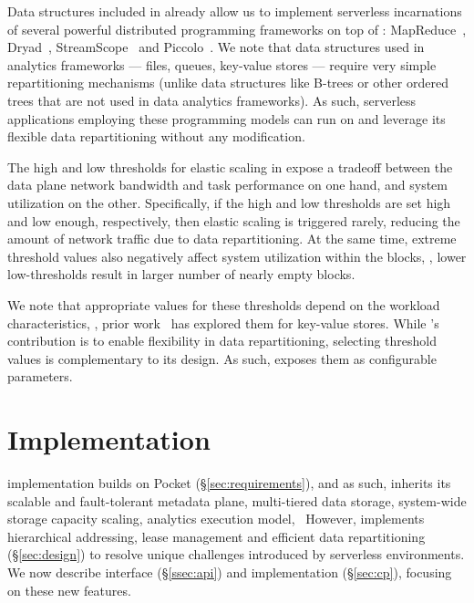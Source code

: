 Data structures included in \jiffy already allow us to implement serverless incarnations of several powerful distributed programming frameworks on top of \jiffy: MapReduce~\cite{mapreduce,spark}, Dryad~\cite{dryad}, StreamScope~\cite{streamscope} and Piccolo~\cite{piccolo}. We note that data structures used in analytics frameworks --- files, queues, key-value stores --- require very simple repartitioning mechanisms (unlike data structures like B-trees or other ordered trees that are not used in data analytics frameworks). As such, serverless applications employing these programming models can run on \jiffy and leverage its flexible data repartitioning without any modification. 

 The high and low thresholds for elastic scaling in \jiffy expose a tradeoff between the data plane network bandwidth and task performance on one hand, and system utilization on the other. Specifically, if the high and low thresholds are set high and low enough, respectively, then elastic scaling is triggered rarely, reducing the amount of network traffic due to data repartitioning. At the same time, extreme threshold values also negatively affect system utilization within the blocks, \eg, lower low-thresholds result in larger number of nearly empty blocks. 

We note that appropriate values for these thresholds depend on the workload characteristics, \eg, prior work~\cite{mongo-shard, ceph-shard} has explored them for key-value stores. While \jiffy's contribution is to enable flexibility in data repartitioning, selecting threshold values is complementary to its design. As such, \jiffy exposes them as configurable parameters.



\section{\jiffy Implementation}
\label{sec:implementation}

\jiffy implementation builds on Pocket (\S\ref{sec:requirements}), and as such, inherits its scalable and fault-tolerant metadata plane, multi-tiered data storage, system-wide storage capacity scaling, analytics execution model, \etc~However, \jiffy implements hierarchical addressing, lease management and efficient data repartitioning (\S\ref{sec:design}) to resolve unique challenges introduced by serverless environments. We now describe \jiffy interface (\S\ref{ssec:api}) and implementation (\S\ref{sec:cp}), focusing on these new features.

